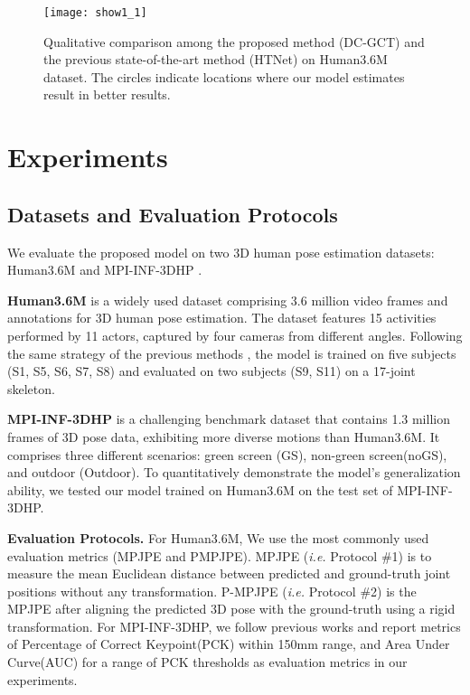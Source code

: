 \documentclass[journal]{IEEEtran}
\begin{document}
\begin{figure*}[t]
\centering
\texttt{[image: show1\_1]}
\caption{Qualitative comparison among the proposed method (DC-GCT) and the previous state-of-the-art method (HTNet) \cite{cai2023htnet}  on Human3.6M dataset. The circles indicate locations where our model estimates result in better results.}
\label{fig:show}
\end{figure*}




\section{Experiments}

\subsection{Datasets and Evaluation Protocols}

We evaluate the proposed model on two 3D human pose estimation datasets: Human3.6M \cite{ionescu2013human3} and MPI-INF-3DHP \cite{mehta2017monocular}.


{\bf{Human3.6M}} is a widely used dataset comprising 3.6 million video frames and annotations for 3D human pose estimation. The dataset features 15 activities performed by 11 actors, captured by four cameras from different angles. Following the same strategy of the previous methods \cite{zou2021modulated,cai2023htnet}, the model is trained on five subjects (S1, S5, S6, S7, S8) and evaluated on two subjects (S9, S11) on a 17-joint skeleton.

{\bf{MPI-INF-3DHP}} is a challenging benchmark dataset that contains 1.3 million frames of 3D pose data, exhibiting more diverse motions than Human3.6M. It comprises three different scenarios: green screen (GS), non-green screen(noGS), and outdoor (Outdoor). To quantitatively demonstrate the model's generalization ability, we tested our model trained on Human3.6M on the test set of MPI-INF-3DHP.


{\bf{Evaluation Protocols.}} For Human3.6M, We use the most commonly used evaluation metrics (MPJPE and PMPJPE). MPJPE (\textit{i.e.} Protocol \#1) is to measure the mean Euclidean distance between predicted and ground-truth joint positions without any transformation. P-MPJPE (\textit{i.e.} Protocol \#2) is the MPJPE after aligning the predicted 3D pose with the ground-truth using a rigid transformation. For MPI-INF-3DHP, we follow previous works \cite{zhao2019semantic,zou2021modulated} and report metrics of Percentage of Correct Keypoint(PCK) within 150mm range, and Area Under Curve(AUC) for a range of PCK thresholds  as evaluation metrics in our experiments.
\end{document}
